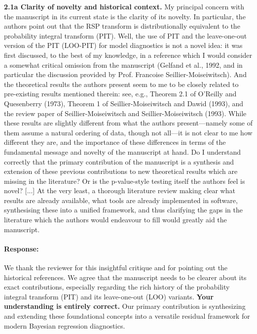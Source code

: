 \documentclass[11pt]{article}
\newcommand*{\mybox}[2]{%
  \par\medskip\noindent
  \colorbox{#1!30}{\parbox{.98\linewidth}{#2}}%
  \par\medskip
}
\begin{document}
\mybox{gray}{\textbf{2.1a Clarity of novelty and historical context.} My principal concern with the manuscript in its current state is the clarity of its novelty. In particular, the authors point out that the RSP transform is distributionally equivalent to the probability integral transform (PIT). Well, the use of PIT and the leave-one-out version of the PIT (LOO-PIT) for model diagnostics is not a novel idea: it was first discussed, to the best of my knowledge, in a reference which I would consider a somewhat critical omission from the manuscript (Gelfand et al., 1992, and in particular the discussion provided by Prof. Francoise Seillier-Moiseiwitsch). And the theoretical results the authors present seem to me to be closely related to pre-existing results mentioned therein: see, e.g., Theorem 2.1 of O'Reilly and Quesenberry (1973), Theorem 1 of Seillier-Moiseiwitsch and Dawid (1993), and the review paper of Seillier-Moiseiwitsch and Seillier-Moiseiwitsch (1993). While these results are slightly different from what the authors present---namely some of them assume a natural ordering of data, though not all---it is not clear to me how different they are, and the importance of these differences in terms of the fundamental message and novelty of the manuscript at hand. Do I understand correctly that the primary contribution of the manuscript is a synthesis and extension of these previous contributions to new theoretical results which are missing in the literature? Or is the p-value-style testing itself the authors feel is novel? [...] At the very least, a thorough literature review making clear what results are already available, what tools are already implemented in software, synthesising these into a unified framework, and thus clarifying the gaps in the literature which the authors would endeavour to fill would greatly aid the manuscript.}

\paragraph{Response:}
We thank the reviewer for this insightful critique and for pointing out the historical references. We agree that the manuscript needs to be clearer about its exact contributions, especially regarding the rich history of the probability integral transform (PIT) and its leave-one-out (LOO) variants. \textbf{Your understanding is entirely correct.} Our primary contribution is synthesizing and extending these foundational concepts into a versatile  residual framework for modern Bayesian regression diagnostics. 
\end{document}
